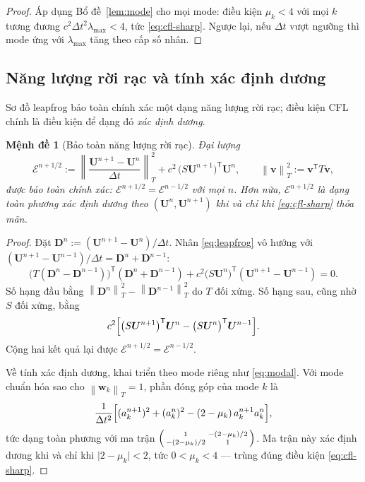 \documentclass[11pt,a4paper]{article}
\theoremstyle{plain}
\newtheorem{proposition}[theorem]{Mệnh đề}
\theoremstyle{definition}
\theoremstyle{remark}
\newcommand{\dt}{\Delta t}
\newcommand{\norm}[1]{\left\lVert #1 \right\rVert}
\newcommand{\Uvec}{\bm{U}}
\newcommand{\lammax}{\lambda_{\max}}
\begin{document}
\begin{proof}
Áp dụng Bổ đề~\ref{lem:mode} cho mọi mode: điều kiện $\mu_{k} < 4$ với mọi $k$
tương đương $c^{2}\dt^{2}\lammax < 4$, tức \eqref{eq:cfl-sharp}. Ngược lại,
nếu $\dt$ vượt ngưỡng thì mode ứng với $\lammax$ tăng theo cấp số nhân.
\end{proof}

\subsection{Năng lượng rời rạc và tính xác định dương}

Sơ đồ leapfrog bảo toàn chính xác một dạng năng lượng rời rạc; điều kiện CFL
chính là điều kiện để dạng đó \emph{xác định dương}.

\begin{proposition}[Bảo toàn năng lượng rời rạc]
\label{prop:disc-energy}
Đại lượng
\begin{equation}
\label{eq:Ediscrete}
  \mathcal{E}^{n+1/2}
  := \left\lVert \frac{\Uvec^{n+1}-\Uvec^{n}}{\dt} \right\rVert_{T}^{2}
   + c^{2}\,\bigl(S\Uvec^{n+1}\bigr)^{\mathsf{T}}\Uvec^{n},
  \qquad \norm{\bm{v}}_{T}^{2} := \bm{v}^{\mathsf{T}}T\bm{v},
\end{equation}
được bảo toàn chính xác: $\mathcal{E}^{n+1/2} = \mathcal{E}^{n-1/2}$ với mọi
$n$. Hơn nữa, $\mathcal{E}^{n+1/2}$ là dạng toàn phương xác định dương theo
$(\Uvec^{n}, \Uvec^{n+1})$ \emph{khi và chỉ khi} \eqref{eq:cfl-sharp} thỏa mãn.
\end{proposition}

\begin{proof}
Đặt $\bm{D}^{n} := (\Uvec^{n+1}-\Uvec^{n})/\dt$. Nhân \eqref{eq:leapfrog} vô
hướng với $(\Uvec^{n+1}-\Uvec^{n-1})/\dt = \bm{D}^{n} + \bm{D}^{n-1}$:
\[
  \bigl(T(\bm{D}^{n}-\bm{D}^{n-1})\bigr)^{\mathsf{T}}
  (\bm{D}^{n}+\bm{D}^{n-1})
  + c^{2}\bigl(S\Uvec^{n}\bigr)^{\mathsf{T}}
    (\Uvec^{n+1}-\Uvec^{n-1}) = 0 .
\]
Số hạng đầu bằng
$\norm{\bm{D}^{n}}_{T}^{2} - \norm{\bm{D}^{n-1}}_{T}^{2}$ do $T$ đối xứng.
Số hạng sau, cũng nhờ $S$ đối xứng, bằng
\[
  c^{2}\Bigl[ \bigl(S\Uvec^{n+1}\bigr)^{\mathsf{T}}\Uvec^{n}
            - \bigl(S\Uvec^{n}\bigr)^{\mathsf{T}}\Uvec^{n-1} \Bigr].
\]
Cộng hai kết quả lại được $\mathcal{E}^{n+1/2} = \mathcal{E}^{n-1/2}$.

Về tính xác định dương, khai triển theo mode riêng như \eqref{eq:modal}. Với
mode chuẩn hóa sao cho $\norm{\bm{w}_{k}}_{T} = 1$, phần đóng góp của mode
$k$ là
\[
  \frac{1}{\dt^{2}}\Bigl[ (a_{k}^{n+1})^{2} + (a_{k}^{n})^{2}
     - (2-\mu_{k})\,a_{k}^{n+1}a_{k}^{n} \Bigr],
\]
tức dạng toàn phương với ma trận
$\begin{psmallmatrix} 1 & -(2-\mu_{k})/2 \\ -(2-\mu_{k})/2 & 1
\end{psmallmatrix}$.
Ma trận này xác định dương khi và chỉ khi
$\lvert 2-\mu_{k} \rvert < 2$, tức $0 < \mu_{k} < 4$ --- trùng đúng điều
kiện \eqref{eq:cfl-sharp}.
\end{proof}
\end{document}

